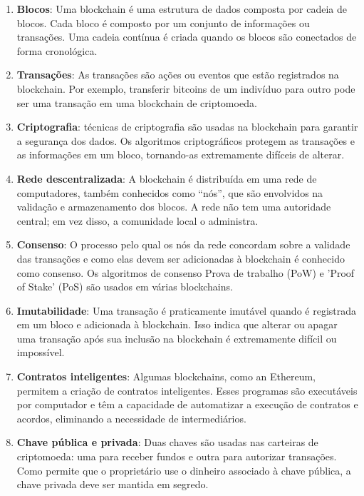 \documentclass[a4paper,12pt]{article}
\begin{document}
\begin{enumerate}
    \item \textbf{Blocos}: Uma blockchain é uma estrutura de dados composta por cadeia de blocos. 
    Cada bloco é composto por um conjunto de informações ou transações. Uma cadeia contínua é 
    criada quando os blocos são conectados de forma cronológica.

    \item \textbf{Transações}: As transações são ações ou eventos que estão registrados na blockchain. Por exemplo, 
    transferir bitcoins de um indivíduo para outro pode ser uma transação em uma blockchain de criptomoeda.
    
    \item \textbf{Criptografia}: técnicas de criptografia são usadas na blockchain para garantir a segurança dos dados. 
    Os algoritmos criptográficos protegem as transações e as informações em um bloco, tornando-as 
    extremamente difíceis de alterar.

    \item \textbf{Rede descentralizada}: A blockchain é distribuída em uma rede de computadores, também conhecidos 
    como ``nós'', que são envolvidos na validação e armazenamento dos blocos. A rede não tem uma autoridade 
    central; em vez disso, a comunidade local o administra.

    \item \textbf{Consenso}: O processo pelo qual os nós da rede concordam sobre a validade das transações e 
    como elas devem ser adicionadas à blockchain é conhecido como consenso. Os algoritmos de consenso 
    Prova de trabalho (PoW) e 'Proof of Stake' (PoS) são usados em várias blockchains.

    \item \textbf{Imutabilidade}: Uma transação é praticamente imutável quando é registrada em um bloco e 
    adicionada à blockchain. Isso indica que alterar ou apagar uma transação após sua inclusão 
    na blockchain é extremamente difícil ou impossível.

    \item \textbf{Contratos inteligentes}: Algumas blockchains, como an Ethereum, permitem a criação de contratos 
    inteligentes. Esses programas são executáveis por computador e têm a capacidade de automatizar a
     execução de contratos e acordos, eliminando a necessidade de intermediários.

     \item \textbf{Chave pública e privada}: Duas chaves são usadas nas carteiras de criptomoeda: uma para 
     receber fundos e outra para autorizar transações. Como permite que o proprietário use o dinheiro associado 
     à chave pública, a chave privada deve ser mantida em segredo.


\end{enumerate}
\end{document}
